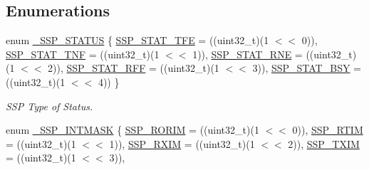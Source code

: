 \subsection*{Enumerations}
\begin{DoxyCompactItemize}
\item 
enum \hyperlink{group___s_s_p__18_x_x__43_x_x_ga4ec33a0121a2ccab848c7b37907d9e9d}{\+\_\+\+S\+S\+P\+\_\+\+S\+T\+A\+T\+US} \{ \newline
\hyperlink{group___s_s_p__18_x_x__43_x_x_gga4ec33a0121a2ccab848c7b37907d9e9daf2476dad0360373ccb5896f6f4283569}{S\+S\+P\+\_\+\+S\+T\+A\+T\+\_\+\+T\+FE} = ((uint32\+\_\+t)(1 $<$$<$ 0)), 
\hyperlink{group___s_s_p__18_x_x__43_x_x_gga4ec33a0121a2ccab848c7b37907d9e9da895067b502eeae3c476190e309abde1a}{S\+S\+P\+\_\+\+S\+T\+A\+T\+\_\+\+T\+NF} = ((uint32\+\_\+t)(1 $<$$<$ 1)), 
\hyperlink{group___s_s_p__18_x_x__43_x_x_gga4ec33a0121a2ccab848c7b37907d9e9da82f15e0720cc2b0dc53e90b7546fb96b}{S\+S\+P\+\_\+\+S\+T\+A\+T\+\_\+\+R\+NE} = ((uint32\+\_\+t)(1 $<$$<$ 2)), 
\hyperlink{group___s_s_p__18_x_x__43_x_x_gga4ec33a0121a2ccab848c7b37907d9e9dad10671a086364beb55efad01f2c3688f}{S\+S\+P\+\_\+\+S\+T\+A\+T\+\_\+\+R\+FF} = ((uint32\+\_\+t)(1 $<$$<$ 3)), 
\newline
\hyperlink{group___s_s_p__18_x_x__43_x_x_gga4ec33a0121a2ccab848c7b37907d9e9da5129659a9c16fdda33b925f07cf8ef52}{S\+S\+P\+\_\+\+S\+T\+A\+T\+\_\+\+B\+SY} = ((uint32\+\_\+t)(1 $<$$<$ 4))
 \}\begin{DoxyCompactList}\small\item\em S\+SP Type of Status. \end{DoxyCompactList}
\item 
enum \hyperlink{group___s_s_p__18_x_x__43_x_x_gab6a0ac593093184dd21c95f53b30f4ef}{\+\_\+\+S\+S\+P\+\_\+\+I\+N\+T\+M\+A\+SK} \{ \newline
\hyperlink{group___s_s_p__18_x_x__43_x_x_ggab6a0ac593093184dd21c95f53b30f4efa891bf6d7622b4f6f010396f08a51adbf}{S\+S\+P\+\_\+\+R\+O\+R\+IM} = ((uint32\+\_\+t)(1 $<$$<$ 0)), 
\hyperlink{group___s_s_p__18_x_x__43_x_x_ggab6a0ac593093184dd21c95f53b30f4efaabb6398ce8ef5db95fc47fc2bd525f13}{S\+S\+P\+\_\+\+R\+T\+IM} = ((uint32\+\_\+t)(1 $<$$<$ 1)), 
\hyperlink{group___s_s_p__18_x_x__43_x_x_ggab6a0ac593093184dd21c95f53b30f4efa2fff5a42799aae53c7a4bf3e3a900448}{S\+S\+P\+\_\+\+R\+X\+IM} = ((uint32\+\_\+t)(1 $<$$<$ 2)), 
\hyperlink{group___s_s_p__18_x_x__43_x_x_ggab6a0ac593093184dd21c95f53b30f4efa34e61a5c1d77d3763e4f8e1bfacbdcc4}{S\+S\+P\+\_\+\+T\+X\+IM} = ((uint32\+\_\+t)(1 $<$$<$ 3)), 
\newline
$$
\end{DoxyCompactItemize}
